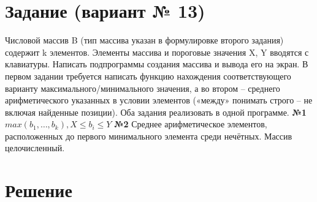 \documentclass[12pt]{article}
\begin{document}
	\newpage
	
	
	\section*{Задание (вариант № 13)}
	
 	Числовой массив B (тип массива указан в формулировке второго задания) содержит k
    элементов. Элементы массива и пороговые значения X, Y вводятся с клавиатуры. Написать
 	подпрограммы создания массива и вывода его на экран. В первом задании требуется написать
 	функцию нахождения соответствующего варианту максимального/минимального значения, а
 	во втором – среднего арифметического указанных в условии элементов («между» понимать
 	строго – не включая найденные позиции).
 	Оба задания реализовать в одной программе.
 	\vspace{5pt}
	\newline
	\textbf{№1} $max(b_1,\ldots,b_k), X \leq b_i \leq Y$ \newline
	\textbf{№2} Среднее арифметическое элементов, расположенных до первого минимального элемента среди нечётных. Массив целочисленный.
	
	\newpage
	
	\section*{Решение}
	
\end{document}
